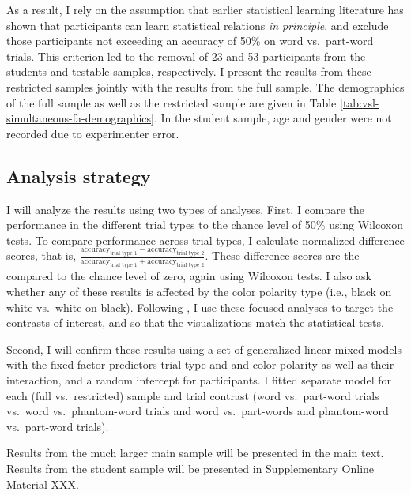 \documentclass[
]{article}
\begin{document}
As a result, I rely on the assumption that earlier statistical learning
literature has shown that participants can learn statistical relations
\emph{in principle}, and exclude those participants not exceeding an
accuracy of 50\% on word vs.~part-word trials. This criterion led to the
removal of 23 and 53 participants from the students and testable
samples, respectively. I present the results from these restricted
samples jointly with the results from the full sample. The demographics
of the full sample as well as the restricted sample are given in Table
\ref{tab:vsl-simultaneous-fa-demographics}. In the student sample, age
and gender were not recorded due to experimenter error.

\subsection{Analysis strategy}\label{analysis-strategy}

I will analyze the results using two types of analyses. First, I compare
the performance in the different trial types to the chance level of 50\%
using Wilcoxon tests. To compare performance across trial types, I
calculate normalized difference scores, that is,
\(\frac{\text{accuracy}_{\text{trial type 1}} - \text{accuracy}_{\text{trial type 2}}}{\text{accuracy}_{\text{trial type 1}} + \text{accuracy}_{\text{trial type 2}}}\).
These difference scores are the compared to the chance level of zero,
again using Wilcoxon tests. I also ask whether any of these results is
affected by the color polarity type (i.e., black on white vs.~white on
black). Following \citep{Rosenthal1999}, I use these focused analyses to
target the contrasts of interest, and so that the visualizations match
the statistical tests.

Second, I will confirm these results using a set of generalized linear
mixed models with the fixed factor predictors trial type and and color
polarity as well as their interaction, and a random intercept for
participants. I fitted separate model for each (full vs.~restricted)
sample and trial contrast (word vs.~part-word trials vs.~word
vs.~phantom-word trials and word vs.~part-words and phantom-word
vs.~part-word trials).

Results from the much larger main sample will be presented in the main
text. Results from the student sample will be presented in Supplementary
Online Material XXX.
\end{document}
